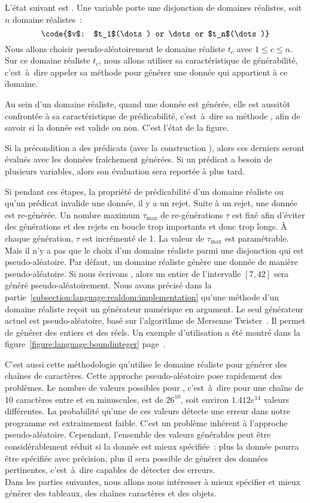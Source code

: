 L'état suivant est . Une variable porte une disjonction de domaines
réalistes, soit $n$ domaine réalistes~:
%
$$\code{$v$: $t_1$(\dots) or \dots or $t_n$(\dots)}$$
%
Nous allons choisir pseudo-aléatoirement le domaine réaliste $t_c$ avec $1 \leq
c \leq n$. Sur ce domaine réaliste $t_c$, nous allons utiliser sa
caractéristique de générabilité, c'est~à~dire appeler sa méthode 
pour générer une donnée qui appartient à ce domaine.

Au sein d'un domaine réaliste, quand une donnée est générée, elle est aussitôt
confrontée à sa caractéristique de prédicabilité, c'est~à~dire sa méthode
, afin de savoir si la donnée est valide ou non. C'est l'état
 de la figure.

Si la précondition a des prédicats (avec la construction ), alors ces
derniers seront évalués avec les données fraîchement générées. Si un prédicat a
besoin de plusieurs variables, alors son évaluation sera reportée à plus tard.

Si pendant ces étapes, la propriété de prédicabilité d'un domaine réaliste ou
qu'un prédicat invalide une donnée, il y a un {\strong rejet}. Suite à un rejet,
une donnée est re-générée. Un nombre maximum $\tau_\mathrm{max}$ de
re-générations $\tau$ est fixé afin d'éviter des générations et des rejets en
boucle trop importants et donc trop longs. À chaque génération, $\tau$ est
incrémenté de 1. La valeur de $\tau_\mathrm{max}$ est paramétrable. \\

Mais il n'y a pas que le choix d'un domaine réaliste parmi une disjonction qui
est pseudo-aléatoire. Par défaut, un domaine réaliste génère une donnée de
manière pseudo-aléatoire.  Si nous écrivons , alors un
entier de l'intervalle $[7, 42]$ sera généré pseudo-aléatoirement. Nous avons
précisé dans la partie~\ref{subsection:language:realdom:implementation} qu'une
méthode  d'un domaine réaliste reçoit un générateur numérique en
argument. Le seul générateur actuel est pseudo-aléatoire, basé sur l'algorithme
de Mersenne Twister~. Il permet de générer des entiers et
des réels. Un exemple d'utilisation a été montré dans la
figure~\ref{figure:language:boundinteger}
page~\pageref{figure:language:boundinteger}.

C'est aussi cette méthodologie qu'utilise le domaine réaliste  pour
générer des chaînes de caractères. Cette approche pseudo-aléatoire pose
rapidement des problèmes. Le nombre de valeurs possibles pour , c'est~à~dire pour une chaîne de 10 caractères entre  et
 en minuscules, est de $26^{10}$, soit environ $1.412e^{14}$ valeurs
différentes. La probabilité qu'une de ces valeurs détecte une erreur dans notre
programme est extraimement faible. C'est un problème inhérent à l'approche
pseudo-aléatoire. Cependant, l'ensemble des valeurs générables peut être
considérablement réduit si la donnée est mieux spécifiée~: plus la donnée pourra
être spécifiée avec précision, plus il sera possible de générer des données
pertinentes, c'est~à~dire capables de détecter des erreurs. \\

Dans les parties suivantes, nous allons nous intéresser à mieux spécifier et
mieux générer des tableaux, des chaînes caractères et des objets.
